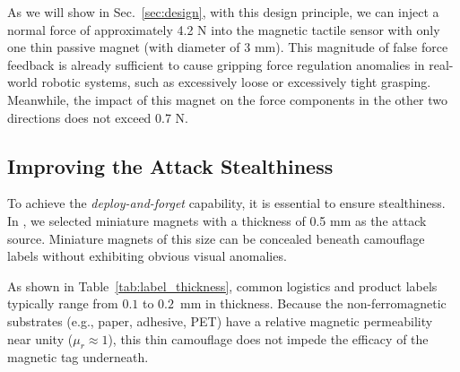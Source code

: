As we will show in Sec.~\ref{sec:design}, with this design principle, we can inject a normal force of approximately 4.2 N into the magnetic tactile sensor with only one thin passive magnet (with diameter of 3 mm). This magnitude of false force feedback is already sufficient to cause gripping force regulation anomalies in real-world robotic systems, such as excessively loose or excessively tight grasping. Meanwhile, the impact of this magnet on the force components in the other two directions does not exceed 0.7 N.

\subsection{Improving the Attack Stealthiness}
To achieve the \emph{deploy-and-forget} capability, it is essential to ensure stealthiness. 
In {\name}, we selected miniature magnets with a thickness of 0.5 mm as the attack source. 
Miniature magnets of this size can be concealed beneath camouflage labels without exhibiting obvious visual anomalies.

\begin{table}[t]
    \centering
    \caption{Common Sticker Thicknesses.}
    \label{tab:label_thickness}
\end{table}

As shown in Table~\ref{tab:label_thickness}, common logistics and product labels typically range from $0.1$ to $0.2$~mm in thickness. 
Because the non-ferromagnetic substrates (e.g., paper, adhesive, PET) have a relative magnetic permeability near unity ($\mu_r \approx 1$), 
this thin camouflage does not impede the efficacy of the magnetic tag underneath.

